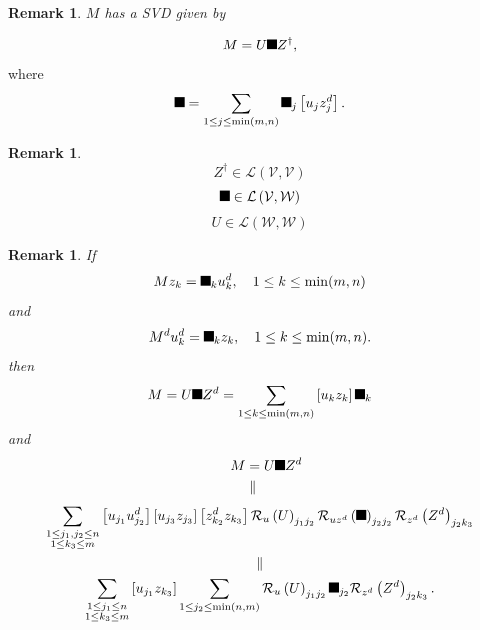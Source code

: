 \documentclass[aps,preprint]{revtex4}%
\providecommand{\U}[1]{\protect\rule{.1in}{.1in}}
\newtheorem{remark}[theorem]{Remark}
\begin{document}
\begin{remark}
$M$ has a \emph{SVD} given by
\end{remark}

%

\begin{equation}
M=U\U{3a3} Z^{\dagger},
\end{equation}
where
\begin{equation}
\U{3a3} =\sum_{1\leq j\leq\min(m,n)}\U{3c3} _{j}\left[  u_{j}z_{j}^{d}\right]
.
\end{equation}


\begin{remark}%
\begin{equation}
Z^{\dagger}\in\mathcal{L}\left(  \mathcal{V},\mathcal{V}\right)
\end{equation}%
\begin{equation}
\U{3a3} \in\mathcal{L}\left(  \mathcal{V},\mathcal{W}\right)
\end{equation}%
\begin{equation}
U\in\mathcal{L}\left(  \mathcal{W},\mathcal{W}\right)
\end{equation}

\end{remark}

\begin{remark}
If
\begin{equation}
Mz_{k}=\U{3c3} _{k}u_{k}^{d},\quad1\leq k\leq\min(m,n)
\end{equation}
and
\begin{equation}
M^{d}u_{k}^{d}=\U{3c3} _{k}z_{k},\quad1\leq k\leq\min(m,n).
\end{equation}
then
\begin{equation}
M=U\U{3a3} Z^{d}=\sum_{1\leq k\leq\min(m,n)}\left[  u_{k}z_{k}\right]  \U{3c3}
_{k}%
\end{equation}
and
\begin{align}
M  &  =U\U{3a3} Z^{d}\\
\quad\quad &  \parallel
\end{align}%
\begin{gather*}
\sum_{\substack{1\leq j_{1},j_{2}\leq n\\1\leq k_{3}\leq m}}\left[  u_{j_{1}%
}u_{j_{2}}^{d}\right]  \left[  u_{j_{3}}z_{j_{3}}\right]  \left[  z_{k_{2}%
}^{d}z_{k_{3}}\right]  \mathcal{R}_{u}\left(  U\right)  _{j_{1}j_{2}%
}\mathcal{R}_{uz^{d}}\left(  \U{3a3} \right)  _{j_{2}j_{2}}\mathcal{R}_{z^{d}%
}\left(  Z^{d}\right)  _{j_{2}k_{3}}\\
\parallel\\
\sum_{\substack{1\leq j_{1}\leq n\\1\leq k_{3}\leq m}}\left[  u_{j_{1}%
}z_{k_{3}}\right]  \sum_{1\leq j_{2}\leq\min\left(  n,m\right)  }%
\mathcal{R}_{u}\left(  U\right)  _{j_{1}j_{2}}\U{3c3} _{j_{2}}\mathcal{R}%
_{z^{d}}\left(  Z^{d}\right)  _{j_{2}k_{3}}.
\end{gather*}

\end{remark}
\end{document}

